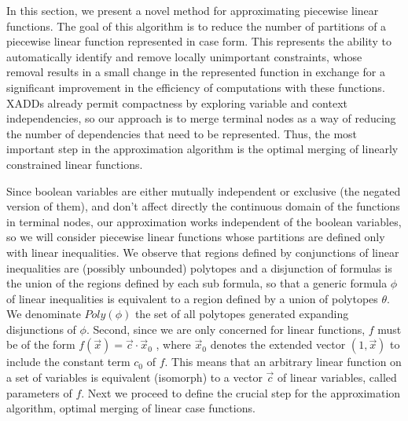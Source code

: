 

In this section, we present a novel method for approximating piecewise linear functions. The goal of this algorithm is to reduce the number of partitions of a piecewise linear function represented in case form. This represents the ability to automatically identify and remove locally unimportant constraints, whose removal results in a small change in the represented function in exchange for a significant improvement in the efficiency of computations with these functions. XADDs already permit compactness by exploring variable and context independencies, so our approach is to merge terminal nodes as a way of reducing the number of dependencies that need to be represented. Thus, the most important step in the approximation algorithm is the optimal merging of linearly constrained linear functions. 

Since boolean variables are either mutually independent or exclusive (the negated version of them), and don't affect directly the continuous domain of the functions in terminal nodes, our approximation works independent of the boolean variables, so we will consider piecewise linear functions whose partitions are defined only with linear inequalities. We observe that regions defined by conjunctions of linear inequalities are (possibly unbounded) polytopes and a disjunction of formulas is the union of the  regions defined by each sub formula, so that a generic formula $\phi$ of linear inequalities is equivalent to a region defined by a union of polytopes $\theta$. We denominate $Poly(\phi)$ the set of all polytopes generated expanding disjunctions of $\phi$.
Second, since we are only concerned for linear functions, $f$ must be of the form $f(\vec{x}) = \vec{c}\cdot \vec{x}_0$ , where $\vec{x}_0$ denotes the extended vector $(1,\vec{x})$ to include the constant term $c_0$ of $f$. This means that an arbitrary linear function on a set of variables is equivalent (isomorph) to a vector $\vec{c}$ of linear variables, called parameters of $f$.
Next we proceed to define the crucial step for the approximation algorithm, optimal merging of linear case functions.

